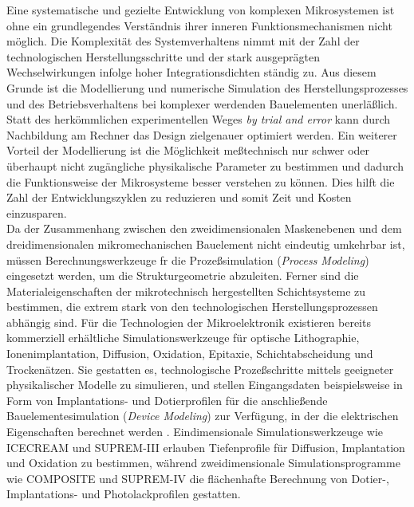 Eine systematische und gezielte Entwicklung von komplexen Mikrosystemen
ist ohne ein grundlegendes Verständnis ihrer inneren Funktionsmechanismen
nicht möglich.
Die Komplexität des Systemverhaltens nimmt mit der Zahl der technologischen
Herstellungsschritte und der stark ausgeprägten Wechselwirkungen infolge
hoher Integrationsdichten ständig zu. Aus diesem Grunde ist die
Modellierung und numerische Simulation des Herstellungsprozesses und des
Betriebsverhaltens bei komplexer werdenden Bauelementen unerläßlich.
Statt des herkömmlichen experimentellen Weges
{\em \glqq by trial and error\grqq} \/ kann durch Nachbildung
am Rechner das Design zielgenauer optimiert werden. Ein weiterer Vorteil
der Modellierung ist die Möglichkeit meßtechnisch nur schwer oder
überhaupt nicht zugängliche physikalische Parameter zu bestimmen und
dadurch die Funktionsweise der Mikrosysteme besser verstehen zu können.
Dies hilft die Zahl der Entwicklungszyklen zu reduzieren und somit Zeit
und Kosten einzusparen.\\
Da der Zusammenhang zwischen den zweidimensionalen Maskenebenen und dem
drei\-dimensionalen mikromechanischen Bauelement nicht eindeutig umkehrbar
ist,
müssen Berechnungswerkzeuge fr die Prozeßsimulation ({\sl Process Modeling})
eingesetzt werden, um die Strukturgeometrie abzuleiten.
Ferner sind die Materialeigenschaften der mikrotechnisch hergestellten
Schichtsysteme zu bestimmen, die extrem stark von den technologischen
Herstellungsprozessen abhängig sind. Für die Technologien der
Mikroelektronik existieren bereits kommerziell erhältliche
Simulationswerkzeuge für optische Lithographie, Ionenimplantation,
Diffusion, Oxidation, Epitaxie, Schichtabscheidung und Trockenätzen.
Sie gestatten es, technologische Prozeßschritte mittels
geeigneter physikalischer Modelle zu simulieren, und stellen
Eingangsdaten beispielsweise in Form von Implantations- und Dotierprofilen
für die anschließende Bauelementesimulation ({\sl Device Modeling}) zur
Verfügung, in der die elektrischen Eigenschaften berechnet werden
\cite{Lor85}. Eindimensionale
Simulationswerkzeuge wie {\sf ICECREAM} \cite{Pic90} und {\sf SUPREM-III}
\cite{TMA} erlauben Tiefenprofile für Diffusion, Implantation und Oxidation
zu bestimmen, während zweidimensionale Simulationsprogramme wie
{\sf COMPOSITE} \cite{COMP} und {\sf SUPREM-IV} \cite{TMA} die flächenhafte
Berechnung von Dotier-, Implantations- und  Photolackprofilen
gestatten.\\
